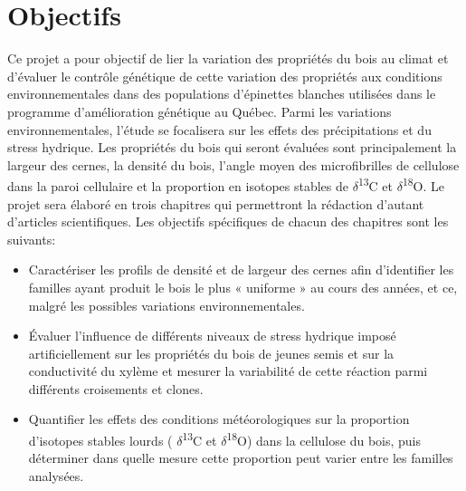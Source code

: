 \documentclass[a4paper,12pt]{report}
\newcommand{\Ctreize}{$\delta$\textsuperscript{13}C\xspace}
\newcommand{\Odixhuit}{$\delta$\textsuperscript{18}O\xspace}
\begin{document}
\section{Objectifs}

Ce projet a pour objectif de lier la variation des propriétés du bois au climat et d'évaluer le contrôle génétique de cette variation des propriétés aux conditions environnementales dans des populations d'épinettes blanches utilisées dans le programme d'amélioration génétique au Québec. Parmi les variations environnementales, l'étude se focalisera sur les effets des précipitations et du stress hydrique. Les propriétés du bois qui seront évaluées sont principalement la largeur des cernes, la densité du bois, l'angle moyen des microfibrilles de cellulose dans la paroi cellulaire et la proportion en isotopes stables de \Ctreize et \Odixhuit. Le projet sera élaboré en trois chapitres qui permettront la rédaction d'autant d'articles scientifiques. Les objectifs spécifiques de chacun des chapitres sont les suivants:\\

\begin{itemize} 
	
	\item Caractériser les profils de densité et de largeur des cernes afin d'identifier les familles ayant produit le bois le plus « uniforme » au cours des années, et ce, malgré les possibles variations environnementales. 
	
	\item Évaluer l'influence de différents niveaux de stress hydrique imposé artificiellement sur les propriétés du bois de jeunes semis et sur la conductivité du xylème et mesurer la variabilité de cette réaction parmi différents croisements et clones. 	
	
	\item Quantifier les effets des conditions météorologiques sur la proportion d'isotopes stables lourds ( \Ctreize et \Odixhuit) dans la cellulose du bois, puis déterminer dans quelle mesure cette proportion peut varier entre les familles analysées.
	

	
\end{itemize}
\end{document}
